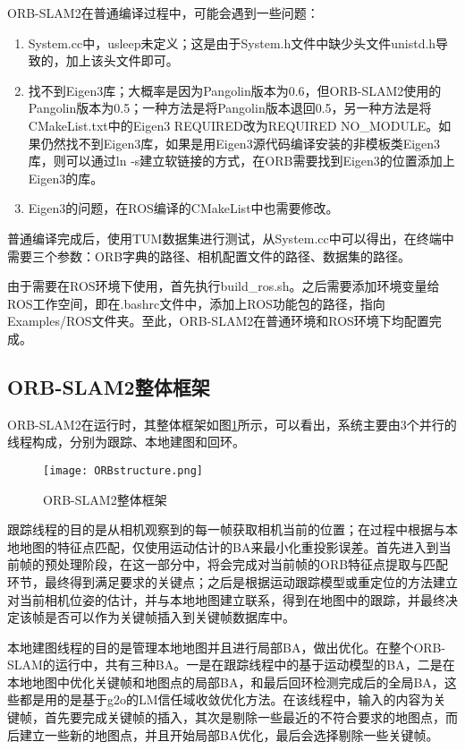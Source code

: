 ORB-SLAM2在普通编译过程中，可能会遇到一些问题：
\begin{enumerate}
	\item System.cc中，usleep未定义；这是由于System.h文件中缺少头文件unistd.h导致的，加上该头文件即可。
	\item 
	找不到Eigen3库；大概率是因为Pangolin版本为0.6，但ORB-SLAM2使用的Pangolin版本为0.5；一种方法是将Pangolin版本退回0.5，另一种方法是将CMakeList.txt中的Eigen3 REQUIRED改为REQUIRED NO\_MODULE。如果仍然找不到Eigen3库，如果是用Eigen3源代码编译安装的非模板类Eigen3库，则可以通过ln -s建立软链接的方式，在ORB需要找到Eigen3的位置添加上Eigen3的库。
	\item 
	Eigen3的问题，在ROS编译的CMakeList中也需要修改。
\end{enumerate}

普通编译完成后，使用TUM数据集进行测试，从System.cc中可以得出，在终端中需要三个参数：ORB字典的路径、相机配置文件的路径、数据集的路径。

由于需要在ROS环境下使用，首先执行build\_ros.sh。之后需要添加环境变量给ROS工作空间，即在.bashrc文件中，添加上ROS功能包的路径，指向Examples/ROS文件夹。至此，ORB-SLAM2在普通环境和ROS环境下均配置完成。

\subsection{ORB-SLAM2整体框架}

ORB-SLAM2在运行时，其整体框架如图\ref{fig-ORBstructure}所示，可以看出，系统主要由3个并行的线程构成，分别为跟踪、本地建图和回环。
~\\
\begin{figure}[!ht]
	\centering
	\texttt{[image: ORBstructure.png]}
	\caption{ORB-SLAM2整体框架}
	\label{fig-ORBstructure}
\end{figure}

跟踪线程的目的是从相机观察到的每一帧获取相机当前的位置；在过程中根据与本地地图的特征点匹配，仅使用运动估计的BA来最小化重投影误差。首先进入到当前帧的预处理阶段，在这一部分中，将会完成对当前帧的ORB特征点提取与匹配环节，最终得到满足要求的关键点；之后是根据运动跟踪模型或重定位的方法建立对当前相机位姿的估计，并与本地地图建立联系，得到在地图中的跟踪，并最终决定该帧是否可以作为关键帧插入到关键帧数据库中。

本地建图线程的目的是管理本地地图并且进行局部BA，做出优化。在整个ORB-SLAM的运行中，共有三种BA。一是在跟踪线程中的基于运动模型的BA，二是在本地地图中优化关键帧和地图点的局部BA，和最后回环检测完成后的全局BA，这些都是用的是基于g2o的LM信任域收敛优化方法。在该线程中，输入的内容为关键帧，首先要完成关键帧的插入，其次是剔除一些最近的不符合要求的地图点，而后建立一些新的地图点，并且开始局部BA优化，最后会选择剔除一些关键帧。

